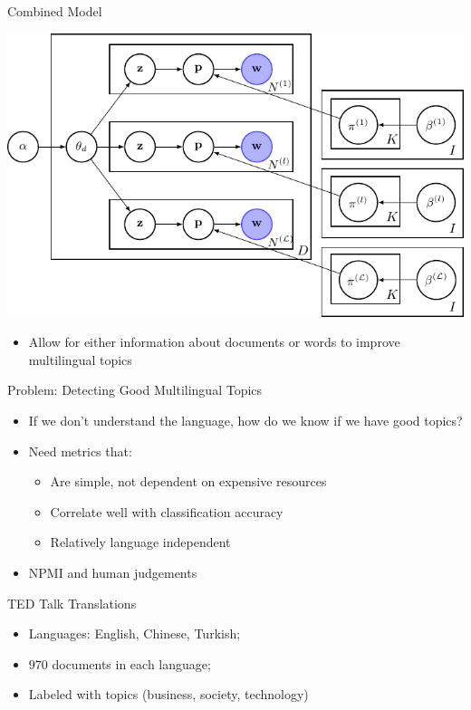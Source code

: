 \documentclass[compress]{beamer}
\begin{document}
	\begin{frame}{Combined Model}
		\begin{center}
			\includegraphics[height=0.4\textheight]{multilingual_itm/link-prior.pdf}
		\end{center}
		\begin{itemize}
			\item Allow for either information about
                          documents or words to improve multilingual topics
		\end{itemize}
	\end{frame}


\begin{frame}{Problem: Detecting Good Multilingual Topics}

\begin{itemize}
  \item If we don't understand the language, how do we know if we have
    good topics?
  \item Need metrics that:
  \begin{itemize}
    \item Are simple, not dependent on expensive resources
    \item Correlate well with classification accuracy
    \item Relatively language independent
   \end{itemize}
\pause
\item NPMI and human judgements
\end{itemize}
\end{frame}

	\begin{frame}{TED Talk Translations}
	    \begin{itemize}
	      \item Languages: English, Chinese, Turkish;
	      \item $970$ documents in each language;
	      \item Labeled with topics (business, society, technology)
	    \end{itemize}
	\end{frame}
\end{document}

